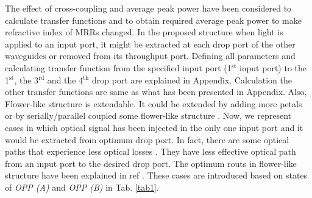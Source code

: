 \documentclass{osa-article}
\begin{document}
 The effect of cross-coupling and average peak power have been considered to calculate transfer functions and to obtain required average peak power to make refractive index of MRRs changed. In the proposed structure when light is applied to an input port, it might be extracted at each drop port of the other waveguides or removed from its throughput port. Defining all parameters and calculating transfer function from the specified input port (1$^{\text{st}}$ input port) to the 1$^{\text{st}}$, the 3$^{\text{rd}}$ and the 4$^{\text{th}}$ drop port are explained in Appendix. Calculation the other transfer functions are same as what has been presented in Appendix. Also, Flower-like structure is extendable. It could be extended by adding more petals or by serially/parallel coupled some flower-like structure \cite{razaghi2016design}. Now, we represent cases in which optical signal has been injected in the only one input port and it would be extracted from optimum drop port. In fact, there are some optical paths that experience less optical losses \cite{razaghi2016design}. They have less effective optical path from an input port to the desired drop port. The optimum routs in flower-like structure have been explained in ref \cite{razaghi2016design}. These cases are introduced based on states of \textit{OPP (A)} and \textit{OPP (B)} in Tab. \ref{tab1}.
\end{document}
